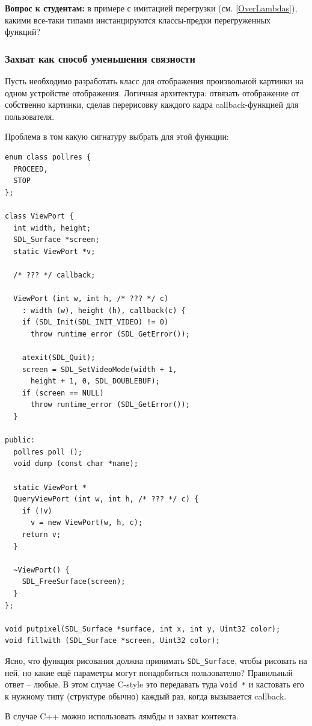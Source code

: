\documentclass[a4paper,12pt,oneside]{article}
\begin{document}
\textbf{Вопрос к студентам:} в примере с имитацией перегрузки (см. \ref{OverLambdas}), какими все-таки типами инстанцируются классы-предки перегруженных функций?

\subsubsection{Захват как способ уменьшения связности}

Пусть необходимо разработать класс для отображения произвольной картинки на одном устройстве отображения. Логичная архитектура: отвязать отображение от собственно картинки, сделав перерисовку каждого кадра callback-функцией для пользователя.

Проблема в том какую сигнатуру выбрать для этой функции:

\begin{lstlisting}
enum class pollres {
  PROCEED,
  STOP
};

class ViewPort {
  int width, height;
  SDL_Surface *screen;
  static ViewPort *v;

  /* ??? */ callback;

  ViewPort (int w, int h, /* ??? */ c)
    : width (w), height (h), callback(c) {
    if (SDL_Init(SDL_INIT_VIDEO) != 0)
      throw runtime_error (SDL_GetError());

    atexit(SDL_Quit);
    screen = SDL_SetVideoMode(width + 1, 
      height + 1, 0, SDL_DOUBLEBUF);
    if (screen == NULL)
      throw runtime_error (SDL_GetError());
  }

public:
  pollres poll ();
  void dump (const char *name);

  static ViewPort *
  QueryViewPort (int w, int h, /* ??? */ c) {
    if (!v)
      v = new ViewPort(w, h, c);
    return v;
  }

  ~ViewPort() {
    SDL_FreeSurface(screen);
  }
};

void putpixel(SDL_Surface *surface, int x, int y, Uint32 color);
void fillwith (SDL_Surface *screen, Uint32 color);
\end{lstlisting}

Ясно, что функция рисования должна принимать \lstinline!SDL_Surface!, чтобы рисовать на ней, но какие ещё параметры могут понадобиться пользователю? Правильный ответ -- любые. В этом случае C-style это передавать туда \lstinline!void *! и кастовать его к нужному типу (структуре обычно) каждый раз, когда вызывается callback.

В случае C++ можно использовать лямбды и захват контекста.
\end{document}
